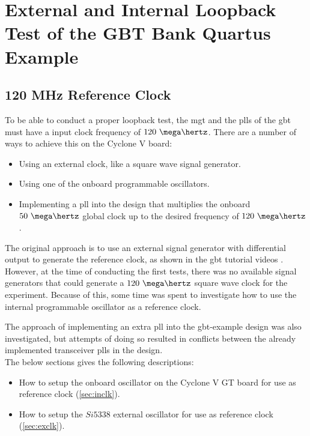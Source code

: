 \documentclass[main.tex]{subfiles}
\begin{document}
\chapter{External and Internal Loopback Test of the GBT Bank Quartus Example}

\section{120 MHz Reference Clock}


To be able to conduct a proper loopback test, the \gls{mgt} and the \glspl{pll} of the \gls{gbt} must have a input clock frequency of $120~\mega\hertz$. There are a number of ways to achieve this on the Cyclone V board: 
\begin{itemize}\setlength{\itemsep}{10pt}
\item Using an external clock, like a square wave signal generator.
\item Using one of the onboard programmable oscillators.
\item Implementing a \gls{pll} into the design that multiplies the onboard $50~\mega\hertz$ global clock up to the desired frequency of $120~\mega\hertz$.\\
\end{itemize}

The original approach is to use an external signal generator with differential output to generate the reference clock, as shown in the \gls{gbt} tutorial videos \cite{gbt_videos}. However, at the time of conducting the first tests, there was no available signal generators that could generate a $120~\mega\hertz$ square wave clock for the experiment. Because of this, some time was spent to investigate how to use the internal programmable oscillator as a reference clock.

The approach of implementing an extra \gls{pll} into the \gls{gbt}-example design was also investigated, but attempts of doing so resulted in conflicts between the already implemented transceiver \glspl{pll} in the design. \\

The below sections gives the following descriptions:
\begin{itemize}\setlength{\itemsep}{10pt}
\item How to setup the onboard oscillator on the Cyclone V GT board for use as reference clock (\ref{sec:inclk}). 
\item How to setup the $Si5338$ external oscillator for use as reference clock (\ref{sec:exclk}).
\end{itemize}
\end{document}
